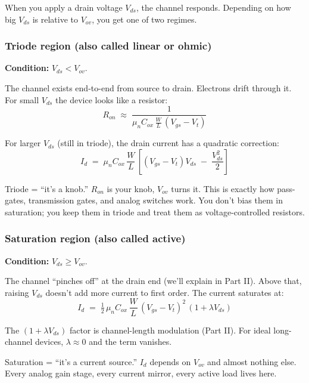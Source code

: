 \documentclass[11pt]{article}
\begin{document}
When you apply a drain voltage $V_{ds}$, the channel responds. Depending on how big $V_{ds}$ is relative to $V_{ov}$, you get one of two regimes.

\subsubsection{Triode region (also called linear or ohmic)}

\textbf{Condition:} $V_{ds} < V_{ov}$.

The channel exists end-to-end from source to drain. Electrons drift through it. For small $V_{ds}$ the device looks like a resistor:
\begin{equation}
R_{on} \;\approx\; \frac{1}{\mu_n C_{ox}\,\frac{W}{L}\,(V_{gs}-V_t)}
\end{equation}

For larger $V_{ds}$ (still in triode), the drain current has a quadratic correction:
\begin{equation}
I_d \;=\; \mu_n C_{ox}\,\frac{W}{L}\,\left[(V_{gs}-V_t)V_{ds} \;-\; \frac{V_{ds}^2}{2}\right]
\end{equation}

\begin{hook}
Triode = ``it's a knob.'' $R_{on}$ is your knob, $V_{ov}$ turns it. This is exactly how pass-gates, transmission gates, and analog switches work. You don't bias them in saturation; you keep them in triode and treat them as voltage-controlled resistors.
\end{hook}

\subsubsection{Saturation region (also called active)}

\textbf{Condition:} $V_{ds} \ge V_{ov}$.

The channel ``pinches off'' at the drain end (we'll explain in Part II). Above that, raising $V_{ds}$ doesn't add more current to first order. The current saturates at:
\begin{equation}
I_d \;=\; \tfrac{1}{2}\,\mu_n C_{ox}\,\frac{W}{L}\,(V_{gs}-V_t)^2\,(1 + \lambda V_{ds})
\end{equation}

The $(1 + \lambda V_{ds})$ factor is channel-length modulation (Part II). For ideal long-channel devices, $\lambda \approx 0$ and the term vanishes.

\begin{hook}
Saturation = ``it's a current source.'' $I_d$ depends on $V_{ov}$ and almost nothing else. Every analog gain stage, every current mirror, every active load lives here.
\end{hook}
\end{document}
